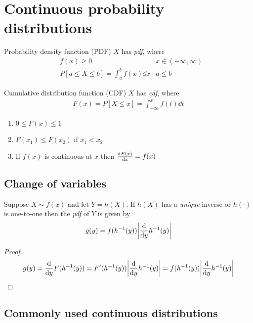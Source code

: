 \documentclass[16pt,a4paper]{article}
\begin{document}
\newpage
\section{Continuous probability distributions}
\begin{defn}{Probability density function (PDF)}
$X$ has \textit{pdf}, where 
\begin{align*}
& f(x) \geq 0 & x\in (-\infty, \infty)\\
& P[a\leq X \leq b] = \int_a^b f(x) \dd x & a\leq b
\end{align*}
\end{defn}

\begin{defn}{Cumulative distribution function (CDF)}
$X$ has \textit{cdf}, where 
\begin{align*}
F(x) = P[X\leq x] = \int_{-\infty}^x f(t) \dd t
\end{align*}
\begin{enumerate}[(1)]
\item $0\leq F(x) \leq 1$
\item $F(x_1) \leq F(x_2)$ if $x_1 < x_2$
\item If $f(x)$ is continuous at $x$ then $\dv{F(x)}{x} = f(x)$
\end{enumerate}
\end{defn}

\subsection{Change of variables}
Suppose $X\sim f(x)$ and let $Y = h(X)$. If $h(X)$ has a \textit{unique} inverse or $h(\cdot)$ is one-to-one then the \textit{pdf} of $Y$ is given by 
\begin{align*}
g(y) = f(h^{-1}(y)) \abs{\dv{}{y}h^{-1}(y)}
\end{align*}
\begin{proof}
\begin{align*}
g(y) = \dv{}{y}F(h^{-1}(y)) = F'(h^{-1}(y))\abs{\dv{}{y}h^{-1}(y)} = f(h^{-1}(y))\abs{\dv{}{y}h^{-1}(y)}
\end{align*}
\end{proof}
\newpage
\subsection{Commonly used continuous distributions}
\end{document}
